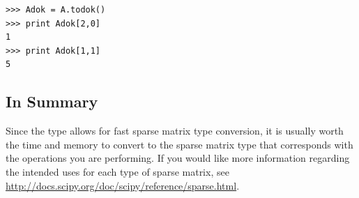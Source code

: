 \begin{lstlisting}
>>> Adok = A.todok()
>>> print Adok[2,0]
1
>>> print Adok[1,1]
5
\end{lstlisting}

\subsection*{In Summary}
Since the  type allows for fast sparse matrix type conversion, it
is usually worth the time and memory to convert to the sparse matrix type that
corresponds with the operations you are performing. If you would like more
information regarding the intended uses for each type of sparse matrix, see
\url{http://docs.scipy.org/doc/scipy/reference/sparse.html}.

